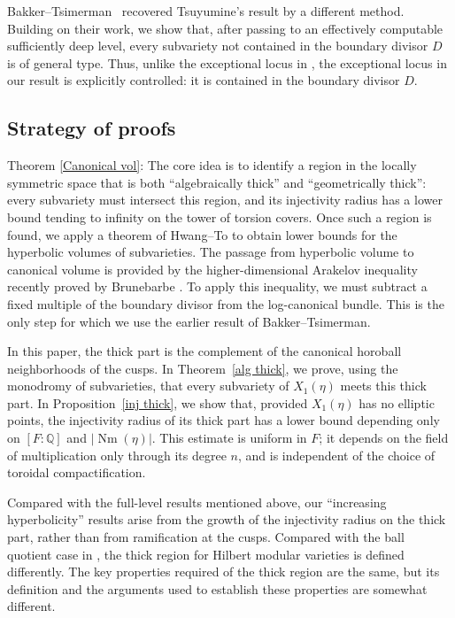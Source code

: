 \documentclass[12 pt]{amsart}
\theoremstyle{definition}
\begin{document}
\begin{enumerate}[leftmargin=*]
Bakker--Tsimerman~\cite[Corollary~G]{bakker2018geometric} recovered
Tsuyumine's result by a different method. Building on their work, we show
that, after passing to an effectively computable sufficiently deep level,
every subvariety not contained in the boundary divisor \(D\) is of general
type. Thus, unlike the exceptional locus in \cite[Theorem~D]{cadorel2019hyperbolicity}, the exceptional locus in our result is explicitly controlled: it is contained in the boundary divisor \(D\).
\end{enumerate}
\subsection*{Strategy of proofs} 
Theorem \ref{Canonical vol}:
 The core idea is to identify a region in the locally symmetric space that
is both ``algebraically thick'' and ``geometrically thick'': every
subvariety must intersect this region, and its injectivity radius has a
lower bound tending to infinity on the tower of torsion covers. Once such a region is found, we apply
a theorem of Hwang--To to obtain lower bounds for the hyperbolic volumes
of subvarieties. The passage from hyperbolic volume to canonical volume
is provided by the higher-dimensional Arakelov inequality recently
proved by Brunebarbe \cite[Theorem~1.6]{brunebarbe2020increasing}. To
apply this inequality, we must subtract a fixed multiple of the boundary
divisor from the log-canonical bundle. This is the only step for which we
use the earlier result of Bakker--Tsimerman.
          

In this paper,  the thick part is the complement of the canonical
horoball neighborhoods of the cusps. In Theorem~\ref{alg thick}, we prove,
using the monodromy of subvarieties, that every subvariety of
\(X_1(\eta)\) meets this thick part. In Proposition~\ref{inj thick}, we
show that, provided \(X_1(\eta)\) has no elliptic points, the injectivity
radius of its thick part has a lower bound depending only on
\([F:\mathbb Q]\) and \(\lvert\operatorname{Nm}(\eta)\rvert\). This
estimate is uniform in \(F\); it depends on the field of multiplication
only through its degree \(n\), and is independent of the choice of
toroidal compactification. 



Compared with the full-level results
mentioned above, our ``increasing hyperbolicity'' results arise from
the growth of the injectivity radius on the thick part, rather than
from ramification at the cusps. 
Compared with the ball quotient case in
\cite{memariansorkhabi2025volumes}, the thick region for Hilbert modular
varieties is defined differently. The key properties required of the
thick region are the same, but its definition and the arguments
used to establish these properties are somewhat different. 
\end{document}
